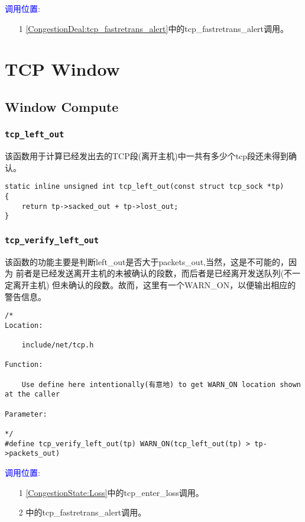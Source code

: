         \textcolor{blue}{调用位置}:
            \begin{enumerate}
                \item[1]       \ref{CongestionDeal:tcp_fastretrans_alert}中的tcp\_fastretrans\_alert调用。
            \end{enumerate}

\section{TCP Window}
    \subsection{Window Compute}
        \subsubsection{\texttt{tcp_left_out}}
            该函数用于计算已经发出去的TCP段(离开主机)中一共有多少个tcp段还未得到确认。
\begin{verbatim}
static inline unsigned int tcp_left_out(const struct tcp_sock *tp)
{
    return tp->sacked_out + tp->lost_out;
}
\end{verbatim}
        \subsubsection{\texttt{tcp_verify_left_out}}
            \label{WindowCompute:tcp_verify_left_out}
            该函数的功能主要是判断left\_out是否大于packets\_out,当然，这是不可能的，因为
            前者是已经发送离开主机的未被确认的段数，而后者是已经离开发送队列(不一定离开主机)
            但未确认的段数。故而，这里有一个WARN\_ON，以便输出相应的警告信息。
\begin{verbatim}
/* 
Location:

    include/net/tcp.h

Function:

    Use define here intentionally(有意地) to get WARN_ON location shown at the caller 

Parameter:

*/
#define tcp_verify_left_out(tp) WARN_ON(tcp_left_out(tp) > tp->packets_out)     
\end{verbatim}


        \textcolor{blue}{调用位置}:

            \begin{enumerate}
                \item[1]        \ref{CongestionState:Loss}中的tcp\_enter\_loss调用。
                \item[2]        \label{CongestionDeal:tcp_fastretrans_alert}中的tcp\_fastretrans\_alert调用。
            \end{enumerate}
